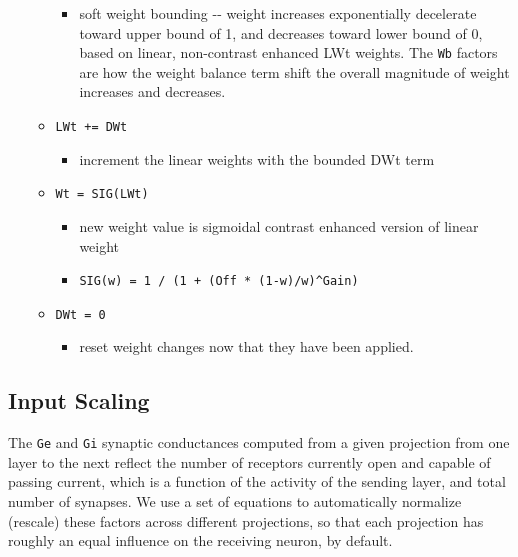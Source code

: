 \begin{itemize}
\begin{itemize}
    \begin{itemize}
    \tightlist
    \item
      soft weight bounding -\/- weight increases exponentially
      decelerate toward upper bound of 1, and decreases toward lower
      bound of 0, based on linear, non-contrast enhanced LWt weights.
      The \texttt{Wb} factors are how the weight balance term shift the
      overall magnitude of weight increases and decreases.
    \end{itemize}
  \item
    \texttt{LWt\ +=\ DWt}

    \begin{itemize}
    \tightlist
    \item
      increment the linear weights with the bounded DWt term
    \end{itemize}
  \item
    \texttt{Wt\ =\ SIG(LWt)}

    \begin{itemize}
    \tightlist
    \item
      new weight value is sigmoidal contrast enhanced version of linear
      weight
    \item
      \texttt{SIG(w)\ =\ 1\ /\ (1\ +\ (Off\ *\ (1-w)/w)\^{}Gain)}
    \end{itemize}
  \item
    \texttt{DWt\ =\ 0}

    \begin{itemize}
    \tightlist
    \item
      reset weight changes now that they have been applied.
    \end{itemize}
  \end{itemize}
\end{itemize}

\hypertarget{input-scaling}{%
\subsection{Input Scaling}\label{input-scaling}}

The \texttt{Ge} and \texttt{Gi} synaptic conductances computed from a
given projection from one layer to the next reflect the number of
receptors currently open and capable of passing current, which is a
function of the activity of the sending layer, and total number of
synapses. We use a set of equations to automatically normalize (rescale)
these factors across different projections, so that each projection has
roughly an equal influence on the receiving neuron, by default.

